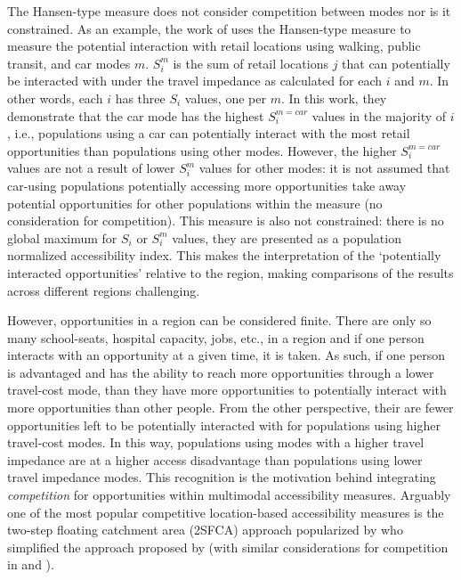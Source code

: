\documentclass[]{trbunofficial}
\begin{document}
The Hansen-type measure does not consider competition between modes nor
is it constrained. As an example, the work of
\citet{tahmasbiMultimodalAccessibilitybasedEquity2019} uses the
Hansen-type measure to measure the potential interaction with retail
locations using walking, public transit, and car modes \(m\). \(S_i^m\)
is the sum of retail locations \(j\) that can potentially be interacted
with under the travel impedance as calculated for each \(i\) and \(m\).
In other words, each \(i\) has three \(S_i\) values, one per \(m\). In
this work, they demonstrate that the car mode has the highest
\(S_i^{m=car}\) values in the majority of \(i\), i.e., populations using
a car can potentially interact with the most retail opportunities than
populations using other modes. However, the higher \(S_i^{m=car}\)
values are not a result of lower \(S_i^{m}\) values for other modes: it
is not assumed that car-using populations potentially accessing more
opportunities take away potential opportunities for other populations
within the measure (no consideration for competition). This measure is
also not constrained: there is no global maximum for \(S_i\) or
\(S_i^m\) values, they are presented as a population normalized
accessibility index. This makes the interpretation of the `potentially
interacted opportunities' relative to the region, making comparisons of
the results across different regions challenging.

However, opportunities in a region can be considered finite. There are
only so many school-seats, hospital capacity, jobs, etc., in a region
and if one person interacts with an opportunity at a given time, it is
taken. As such, if one person is advantaged and has the ability to reach
more opportunities through a lower travel-cost mode, than they have more
opportunities to potentially interact with more opportunities than other
people. From the other perspective, their are fewer opportunities left
to be potentially interacted with for populations using higher
travel-cost modes. In this way, populations using modes with a higher
travel impedance are at a higher access disadvantage than populations
using lower travel impedance modes. This recognition is the motivation
behind integrating \emph{competition} for opportunities within
multimodal accessibility measures. Arguably one of the most popular
competitive location-based accessibility measures is the two-step
floating catchment area (2SFCA) approach popularized by
\citet{luoMeasuresSpatialAccessibility2003} who simplified the approach
proposed by \citet{shenLocationCharacteristicsInnercity1998} (with
similar considerations for competition in
\citet{weibullAxiomaticApproachMeasurement1976} and
\citet{josephMeasuringPotentialPhysical1982}).
\end{document}
